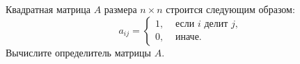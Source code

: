 \documentclass{article}
\begin{document}
Квадратная матрица $A$ размера $n\times n$ строится следующим образом:
$$a_{ij} = \begin{cases}1,& \textrm{ если }i\textrm{ делит }j,\\0,& \text{ иначе.}\end{cases}$$
Вычислите определитель матрицы $A$.
\end{document}
